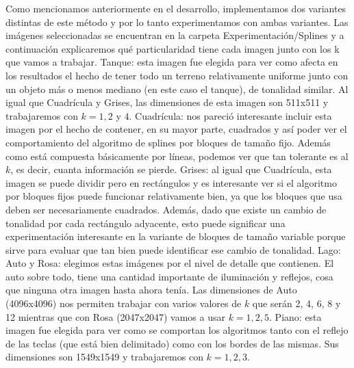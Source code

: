 \documentclass[a4paper]{article}
\begin{document}
Como mencionamos anteriormente en el desarrollo, implementamos dos variantes distintas de este método y por lo tanto experimentamos con ambas variantes. Las imágenes seleccionadas se encuentran en la carpeta Experimentación/Splines y a continuación explicaremos qué particularidad tiene cada imagen junto con los k que vamos a trabajar.
\newline
\newline Tanque: esta imagen fue elegida para ver como afecta en los resultados el hecho de tener todo un terreno relativamente uniforme junto con un objeto más o menos mediano (en este caso el tanque), de tonalidad similar. Al igual que Cuadrícula y Grises, las dimensiones de esta imagen son 511x511 y trabajaremos con $k = 1, 2$ y $4$.
\newline \newline Cuadrícula: nos pareció interesante incluir esta imagen por el hecho de contener, en su mayor parte, cuadrados y así poder ver el comportamiento del algoritmo de splines por bloques de tamaño fijo. Además como está compuesta básicamente por líneas, podemos ver que tan tolerante es al $k$, es decir, cuanta información se pierde.
\newline \newline Grises: al igual que Cuadrícula, esta imagen se puede dividir pero en rectángulos y es interesante ver si el algoritmo por bloques fijos puede funcionar relativamente bien, ya que los bloques que usa deben ser necesariamente cuadrados. Además, dado que existe un cambio de tonalidad por cada rectángulo adyacente, esto puede significar una experimentación interesante en la variante de bloques de tamaño variable porque sirve para evaluar que tan bien puede identificar ese cambio de tonalidad.
\newline \newline Lago: 
\newline \newline Auto y Rosa: elegimos estas imágenes por el nivel de detalle que contienen. El auto sobre todo, tiene una cantidad importante de iluminación y reflejos, cosa que ninguna otra imagen hasta ahora tenía. Las dimensiones de Auto (4096x4096) nos permiten trabajar con varios valores de $k$ que serán 2, 4, 6, 8 y 12 mientras que con Rosa (2047x2047) vamos a usar $k = 1, 2, 5$.
\newline \newline Piano: esta imagen fue elegida para ver como se comportan los algoritmos tanto con el reflejo de las teclas (que está bien delimitado) como con los bordes de las mismas. Sus dimensiones son 1549x1549 y trabajaremos con $k = 1, 2, 3$.
\end{document}
